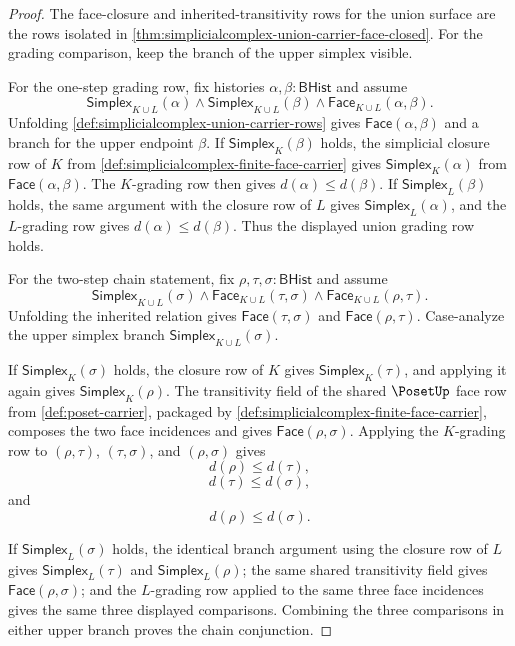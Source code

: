 \begin{proof}
The face-closure and inherited-transitivity rows for the union surface are the rows isolated in \autoref{thm:simplicialcomplex-union-carrier-face-closed}. For the grading comparison, keep the branch of the upper simplex visible.

For the one-step grading row, fix histories $\alpha,\beta:\mathsf{BHist}$ and assume
$$
\mathsf{Simplex}_{K\cup L}(\alpha)\land
\mathsf{Simplex}_{K\cup L}(\beta)\land
\mathsf{Face}_{K\cup L}(\alpha,\beta).
$$
Unfolding \autoref{def:simplicialcomplex-union-carrier-rows} gives $\mathsf{Face}(\alpha,\beta)$ and a branch for the upper endpoint $\beta$. If $\mathsf{Simplex}_K(\beta)$ holds, the simplicial closure row of $K$ from \autoref{def:simplicialcomplex-finite-face-carrier} gives $\mathsf{Simplex}_K(\alpha)$ from $\mathsf{Face}(\alpha,\beta)$. The $K$-grading row then gives $d(\alpha)\le d(\beta)$. If $\mathsf{Simplex}_L(\beta)$ holds, the same argument with the closure row of $L$ gives $\mathsf{Simplex}_L(\alpha)$, and the $L$-grading row gives $d(\alpha)\le d(\beta)$. Thus the displayed union grading row holds.

For the two-step chain statement, fix $\rho,\tau,\sigma:\mathsf{BHist}$ and assume
$$
\mathsf{Simplex}_{K\cup L}(\sigma)
\land
\mathsf{Face}_{K\cup L}(\tau,\sigma)
\land
\mathsf{Face}_{K\cup L}(\rho,\tau).
$$
Unfolding the inherited relation gives $\mathsf{Face}(\tau,\sigma)$ and $\mathsf{Face}(\rho,\tau)$. Case-analyze the upper simplex branch $\mathsf{Simplex}_{K\cup L}(\sigma)$.

If $\mathsf{Simplex}_K(\sigma)$ holds, the closure row of $K$ gives $\mathsf{Simplex}_K(\tau)$, and applying it again gives $\mathsf{Simplex}_K(\rho)$. The transitivity field of the shared $\PosetUp$ face row from \autoref{def:poset-carrier}, packaged by \autoref{def:simplicialcomplex-finite-face-carrier}, composes the two face incidences and gives $\mathsf{Face}(\rho,\sigma)$. Applying the $K$-grading row to $(\rho,\tau)$, $(\tau,\sigma)$, and $(\rho,\sigma)$ gives
$$
d(\rho)\le d(\tau),
$$
$$
d(\tau)\le d(\sigma),
$$
and
$$
d(\rho)\le d(\sigma).
$$

If $\mathsf{Simplex}_L(\sigma)$ holds, the identical branch argument using the closure row of $L$ gives $\mathsf{Simplex}_L(\tau)$ and $\mathsf{Simplex}_L(\rho)$; the same shared transitivity field gives $\mathsf{Face}(\rho,\sigma)$; and the $L$-grading row applied to the same three face incidences gives the same three displayed comparisons. Combining the three comparisons in either upper branch proves the chain conjunction.
\end{proof}

